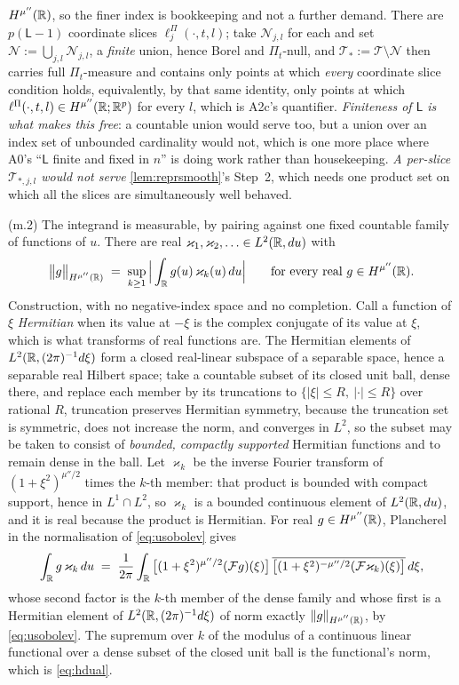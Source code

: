 $H^{\mu''}(\mathbb{R})$, so the finer index is bookkeeping and not a further demand. There are
$p(\mathsf L-1)$ coordinate slices $\ell^\Pi_j(\cdot,t,l)$; take $\mathcal N_{j,l}$ for each and set
$\mathcal N:=\bigcup_{j,l}\mathcal N_{j,l}$, a \emph{finite} union, hence Borel and $\Pi_t$-null, and
$\mathcal T_\ast:=\mathcal T\setminus\mathcal N$ then carries full $\Pi_t$-measure and contains only
points at which \emph{every} coordinate slice condition holds, equivalently, by that same identity,
only points at which $\ell^\Pi(\cdot,t,l)\in H^{\mu''}(\mathbb{R};\mathbb{R}^{p})$ for every $l$, which is A2c's
quantifier. \emph{Finiteness of $\mathsf L$ is what makes this
free}: a countable union would serve too, but a union over an index set of unbounded cardinality would
not, which is one more place where A0's ``$\mathsf L$ finite and fixed in $n$'' is doing work rather
than housekeeping. \emph{A per-slice $\mathcal T_{\ast,j,l}$ would not serve} \cref{lem:reprsmooth}'s
Step~2, which needs one product set on which all the slices are simultaneously well behaved.

\textup{(m.2)} The integrand is measurable, by pairing against one fixed countable family of
functions of $u$. There are real $\varkappa_1,\varkappa_2,\ldots\in L^{2}(\mathbb{R},du)$ with
\begin{equation}\label{eq:hdual}
\big\|g\big\|_{H^{\mu''}(\mathbb{R})}\;=\;\sup_{k\ge1}\Big|\int_{\mathbb{R}}g(u)\,\varkappa_k(u)\,du\Big|
\qquad\text{for every real }g\in H^{\mu''}(\mathbb{R}).
\end{equation}
Construction, with no negative-index space and no completion. Call a function of $\xi$
\emph{Hermitian} when its value at $-\xi$ is the complex conjugate of its value at $\xi$, which is what
transforms of real functions are. The Hermitian elements of $L^{2}(\mathbb{R},(2\pi)^{-1}d\xi)$ form a closed
real-linear subspace of a separable space, hence a separable real Hilbert space; take a countable subset
of its closed unit ball, dense there, and replace each member by its truncations to
$\{|\xi|\le R,\ |\cdot|\le R\}$ over rational $R$, truncation preserves Hermitian symmetry, because
the truncation set is symmetric, does not increase the norm, and converges in $L^{2}$, so the subset
may be taken to consist of \emph{bounded, compactly supported} Hermitian functions and to remain dense in
the ball. Let $\varkappa_k$ be the inverse Fourier transform of $(1+\xi^{2})^{\mu''/2}$ times the $k$-th
member: that product is bounded with compact support, hence in $L^{1}\cap L^{2}$, so $\varkappa_k$ is a
bounded continuous element of $L^{2}(\mathbb{R},du)$, and it is real because the product is Hermitian. For real
$g\in H^{\mu''}(\mathbb{R})$, Plancherel in the normalisation of \eqref{eq:usobolev} gives
\[
\int_{\mathbb{R}}g\,\varkappa_k\,du
\;=\;\frac1{2\pi}\int_{\mathbb{R}}\big[(1+\xi^{2})^{\mu''/2}(\mathcal Fg)(\xi)\big]\,
\overline{\big[(1+\xi^{2})^{-\mu''/2}(\mathcal F\varkappa_k)(\xi)\big]}\,d\xi ,
\]
whose second factor is the $k$-th member of the dense family and whose first is a Hermitian element of
$L^{2}(\mathbb{R},(2\pi)^{-1}d\xi)$ of norm exactly $\|g\|_{H^{\mu''}(\mathbb{R})}$, by \eqref{eq:usobolev}. The
supremum over $k$ of the modulus of a continuous linear functional over a dense subset of the closed unit
ball is the functional's norm, which is \eqref{eq:hdual}.


